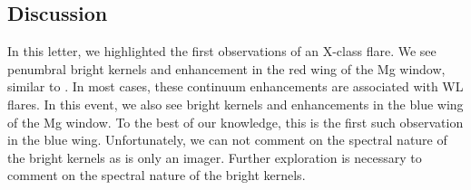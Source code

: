 \subsection{Discussion}\label{sec:disc}

In this letter, we highlighted the first {\suit} observations of an X-class flare. We see penumbral bright kernels and enhancement in the red wing of the Mg window, similar to \cite{kowalski19,kowalski17,kleint17}. In most cases, these continuum enhancements are associated with WL flares. In this event, we also see bright kernels and enhancements in the blue wing of the Mg window. To the best of our knowledge, this is the first such observation in the blue wing. Unfortunately, we can not comment on the spectral nature of the bright kernels as {\suit} is only an imager. Further exploration is necessary to comment on the spectral nature of the bright kernels.